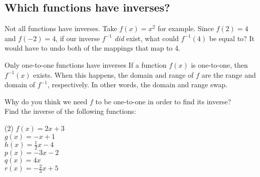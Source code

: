 \documentclass[12pt,fleqn]{book}
\begin{document}
\subsection*{Which functions have inverses?}
Not all functions have inverses.  Take $f(x)=x^2$ for example.  Since $f(2)=4$ and $f(-2)=4$, if our inverse $f^{-1}$ \emph{did} exist, what could $f^{-1}(4)$ be equal to?  It would have to undo both of the mappings that map to 4.  
\begin{thm}{Only one-to-one functions have inverses}{}
    If a function $f(x)$ is one-to-one, then $f^{-1}(x)$ exists.  When this happens, the domain and range of $f$ are the range and domain of $f^{-1}$, respectively.  In other words, the domain and range swap.  
\end{thm}
Why do you think we need $f$ to be one-to-one in order to find its inverse?
\\[2in]
Find the inverse of the following functions:
\begin{tasks}(2)
\task $f(x) = 2x + 3 $\\[2in]
\task $g(x) = -x + 1 $\\[2in]
\task $h(x) = \tfrac{1}{2}x - 4 $\\[2in]
\task $p(x) = -3x - 2 $\\[2in]
\task $q(x) = 4x $\\[2in]
\task $r(x) = -\tfrac{2}{3}x + 5$\\[2in]
\end{tasks}
\end{document}
